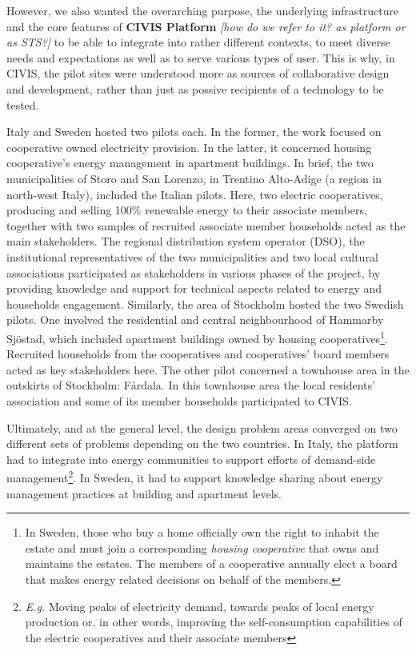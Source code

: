 However, we also wanted the overarching purpose, the underlying infrastructure and the core features of 
\textbf{CIVIS Platform} \textit{[how do we refer to it? as platform or as STS?]} to be able to integrate 
into rather different contexts, to meet diverse needs and expectations as well as to serve various 
types of user. This is why, in CIVIS, the pilot sites were understood more as sources of collaborative design and development,
rather than just as possive recipients of a technology to be tested.  

Italy and Sweden hosted two pilots each. In the former, the work focused on cooperative owned 
electricity provision. In the latter, it concerned housing cooperative's energy management in 
apartment buildings. 
In brief, the two municipalities of Storo and San Lorenzo, in Trentino Alto-Adige (a region in 
north-west Italy), included the Italian pilots. Here, two electric cooperatives, producing and 
selling 100\% renewable energy to their associate members, together with two samples of recruited 
associate member households acted as the main stakeholders. The regional distribution system 
operator (DSO), the institutional representatives of the two municipalities and two local cultural 
associations participated as stakeholders in various phases of the project, by providing knowledge 
and support for technical aspects related to energy and households engagement.
Similarly, the area of Stockholm hosted the two Swedish pilots. One involved the residential and 
central neighbourhood of Hammarby Sj\"{o}stad, which included apartment buildings owned by housing 
cooperatives\footnote{In Sweden, those who buy a home officially own the right to inhabit the estate 
and must join a corresponding \textit{housing cooperative} that owns and maintains the estates. The 
members of a cooperative annually elect a board that makes energy related decisions on behalf of 
the members.}. Recruited households from the cooperatives and cooperatives' board members acted
as key stakeholders here. %
The other pilot concerned a townhouse area in the outskirts of Stockholm: F\aa{}rdala. In this townhouse area the 
local residents’ association and some of its member households participated to CIVIS.

Ultimately, and at the general level, the design problem areas converged on two different sets of problems
depending on the two countries. In Italy, the platform had to integrate into energy communities to support
efforts of demand-side management\footnote{\textit{E.g.} Moving peaks of electricity demand, towards peaks of local energy
production or, in other words, improving the self-consumption capabilities of the electric cooperatives and
their associate members}. In Sweden, it had to support knowledge sharing about energy management practices at building
and apartment levels.

